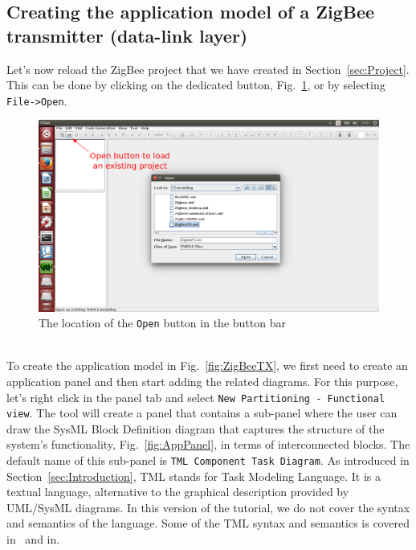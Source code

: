 \documentclass{llncs}
\newcommand{\screenshotsize}{1.0\textwidth}
\begin{document}
\subsection{Creating the application model of a ZigBee transmitter (data-link
layer)}
%
Let's now reload the ZigBee project that we have created in Section~\ref{sec:Project}. This can be done by clicking on
the dedicated button, Fig.~\ref{fig:Open}, or by selecting \texttt{File->Open}.
%
\begin{figure}[!htbp]
	\centering
	\includegraphics[width=\screenshotsize]{figures/screenshot/Open.png}
	\caption{The location of the \texttt{Open} button in the button bar}
	\label{fig:Open}
\end{figure}
%
\\To create the application model in Fig.~\ref{fig:ZigBeeTX}, we first need to create an application panel and
then start adding the related diagrams. For this purpose, let's right click in the panel tab and select \texttt{New
Partitioning - Functional view}. The tool will create a panel that contains a
sub-panel where the user can draw the SysML Block Definition diagram that captures the structure of the system's functionality, Fig.~\ref{fig:AppPanel}, in
terms of interconnected blocks. The default name of this sub-panel is \texttt{TML Component Task Diagram}. As introduced
in Section~\ref{sec:Introduction}, TML stands for Task Modeling Language. It is a textual language, alternative to the
graphical description provided by UML/SysML diagrams. In this version of the tutorial, we do not cover the syntax and
semantics of the language. Some of the TML syntax and semantics is covered in~\cite{Waseem09} and in\cite{EnriciThesis}.
%
\end{document}
